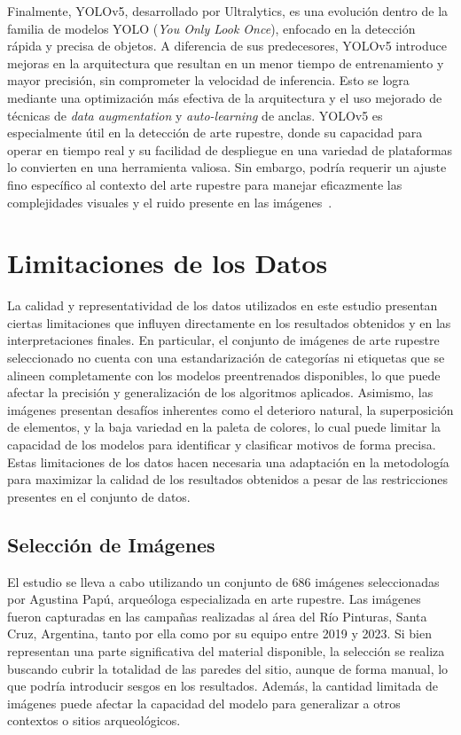 Finalmente, YOLOv5, desarrollado por Ultralytics, es una evolución dentro de la familia de modelos YOLO (\textit{You Only Look Once}), enfocado en la detección rápida y precisa de objetos. A diferencia de sus predecesores, YOLOv5 introduce mejoras en la arquitectura que resultan en un menor tiempo de entrenamiento y mayor precisión, sin comprometer la velocidad de inferencia. Esto se logra mediante una optimización más efectiva de la arquitectura y el uso mejorado de técnicas de \textit{data augmentation} y \textit{auto-learning} de anclas. YOLOv5 es especialmente útil en la detección de arte rupestre, donde su capacidad para operar en tiempo real y su facilidad de despliegue en una variedad de plataformas lo convierten en una herramienta valiosa. Sin embargo, podría requerir un ajuste fino específico al contexto del arte rupestre para manejar eficazmente las complejidades visuales y el ruido presente en las imágenes~\cite{yolov5}.

\section{Limitaciones de los Datos}

La calidad y representatividad de los datos utilizados en este estudio presentan ciertas limitaciones que influyen directamente en los resultados obtenidos y en las interpretaciones finales. En particular, el conjunto de imágenes de arte rupestre seleccionado no cuenta con una estandarización de categorías ni etiquetas que se alineen completamente con los modelos preentrenados disponibles, lo que puede afectar la precisión y generalización de los algoritmos aplicados. Asimismo, las imágenes presentan desafíos inherentes como el deterioro natural, la superposición de elementos, y la baja variedad en la paleta de colores, lo cual puede limitar la capacidad de los modelos para identificar y clasificar motivos de forma precisa. Estas limitaciones de los datos hacen necesaria una adaptación en la metodología para maximizar la calidad de los resultados obtenidos a pesar de las restricciones presentes en el conjunto de datos.

\subsection{Selección de Imágenes}
El estudio se lleva a cabo utilizando un conjunto de 686 imágenes seleccionadas por Agustina Papú, arqueóloga especializada en arte rupestre. Las imágenes fueron capturadas en las campañas realizadas al área del Río Pinturas, Santa Cruz, Argentina, tanto por ella como por su equipo entre 2019 y 2023. Si bien representan una parte significativa del material disponible, la selección se realiza buscando cubrir la totalidad de las paredes del sitio, aunque de forma manual, lo que podría introducir sesgos en los resultados. Además, la cantidad limitada de imágenes puede afectar la capacidad del modelo para generalizar a otros contextos o sitios arqueológicos.

